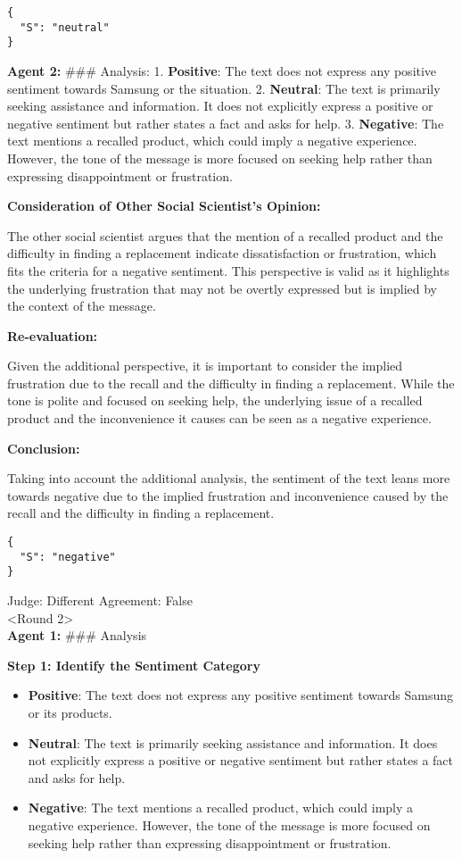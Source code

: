 \begin{verbatim}
{
  "S": "neutral"
}
\end{verbatim}

\textbf{Agent 2:} \#\#\# Analysis: 1. \textbf{Positive}: The text does not
express any positive sentiment towards Samsung or the situation. 2.
\textbf{Neutral}: The text is primarily seeking assistance and
information. It does not explicitly express a positive or negative
sentiment but rather states a fact and asks for help. 3.
\textbf{Negative}: The text mentions a recalled product, which could
imply a negative experience. However, the tone of the message is more
focused on seeking help rather than expressing disappointment or
frustration.

\textbf{Consideration of Other Social Scientist's
Opinion:}

The other social scientist argues that the mention of a recalled product
and the difficulty in finding a replacement indicate dissatisfaction or
frustration, which fits the criteria for a negative sentiment. This
perspective is valid as it highlights the underlying frustration that
may not be overtly expressed but is implied by the context of the
message.

\textbf{Re-evaluation:}

Given the additional perspective, it is important to consider the
implied frustration due to the recall and the difficulty in finding a
replacement. While the tone is polite and focused on seeking help, the
underlying issue of a recalled product and the inconvenience it causes
can be seen as a negative experience.

\textbf{Conclusion:}

Taking into account the additional analysis, the sentiment of the text
leans more towards negative due to the implied frustration and
inconvenience caused by the recall and the difficulty in finding a
replacement.

\begin{verbatim}
{
  "S": "negative"
}
\end{verbatim}

Judge: Different Agreement: False\\

<Round 2>\\

\textbf{Agent 1:} \#\#\# Analysis

\textbf{Step 1: Identify the Sentiment Category}

\begin{itemize}
\tightlist
\item
  \textbf{Positive}: The text does not express any positive sentiment
  towards Samsung or its products.
\item
  \textbf{Neutral}: The text is primarily seeking assistance and
  information. It does not explicitly express a positive or negative
  sentiment but rather states a fact and asks for help.
\item
  \textbf{Negative}: The text mentions a recalled product, which could
  imply a negative experience. However, the tone of the message is more
  focused on seeking help rather than expressing disappointment or
  frustration.
\end{itemize}

